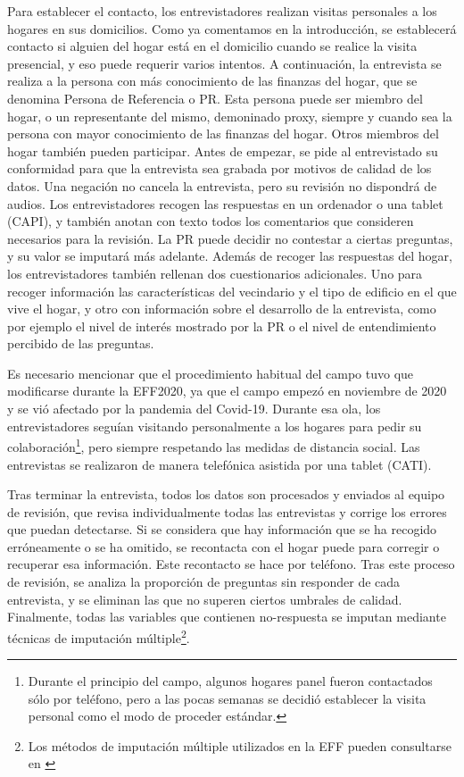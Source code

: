Para establecer el contacto, los entrevistadores realizan visitas personales a los hogares en sus domicilios. Como ya comentamos en la introducción, se establecerá contacto si alguien del hogar está en el domicilio cuando se realice la visita presencial, y eso puede requerir varios intentos. A continuación, la entrevista se realiza a la persona con más conocimiento de las finanzas del hogar, que se denomina Persona de Referencia o PR. Esta persona puede ser miembro del hogar, o un representante del mismo, demoninado proxy, siempre y cuando sea la persona con mayor conocimiento de las finanzas del hogar. Otros miembros del hogar también pueden participar. Antes de empezar, se pide al entrevistado su conformidad para que la entrevista sea grabada por motivos de calidad de los datos. Una negación no cancela la entrevista, pero su revisión no dispondrá de audios. Los entrevistadores recogen las respuestas en un ordenador o una tablet (CAPI), y también anotan con texto todos los comentarios que consideren necesarios para la revisión. La PR puede decidir no contestar a ciertas preguntas, y su valor se imputará más adelante. Además de recoger las respuestas del hogar, los entrevistadores también rellenan dos cuestionarios adicionales. Uno para recoger información las características del vecindario y el tipo de edificio en el que vive el hogar, y otro con información sobre el desarrollo de la entrevista, como por ejemplo el nivel de interés mostrado por la PR o el nivel de entendimiento percibido de las preguntas.

Es necesario mencionar que el procedimiento habitual del campo tuvo que modificarse durante la EFF2020, ya que el campo empezó en noviembre de 2020 y se vió afectado por la pandemia del Covid-19. Durante esa ola, los entrevistadores seguían visitando personalmente a los hogares para pedir su colaboración\footnote{Durante el principio del campo, algunos hogares panel fueron contactados sólo por teléfono, pero a las pocas semanas se decidió establecer la visita personal como el modo de proceder estándar.}, pero siempre respetando las medidas de distancia social. Las entrevistas se realizaron de manera telefónica asistida por una tablet (CATI).

Tras terminar la entrevista, todos los datos son procesados y enviados al equipo de revisión, que revisa individualmente todas las entrevistas y corrige los errores que puedan detectarse. Si se considera que hay información que se ha recogido erróneamente o se ha omitido, se recontacta con el hogar puede para corregir o recuperar esa información. Este recontacto se hace por teléfono. Tras este proceso de revisión, se analiza la proporción de preguntas sin responder de cada entrevista, y se eliminan las que no superen ciertos umbrales de calidad. Finalmente, todas las variables que contienen no-respuesta se imputan mediante técnicas de imputación múltiple\footnote{Los métodos de imputación múltiple utilizados en la EFF pueden consultarse en \cite{barcelo2006imputation}}.

